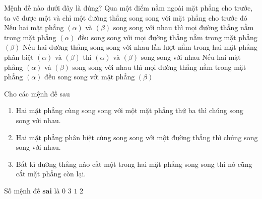 \begin{ex}%
	Mệnh đề nào dưới  đây là đúng?
	\choice 
		{Qua một điểm nằm ngoài mặt phẳng cho trước, ta vẽ được một và chỉ một đường thẳng song  song với mặt phẳng cho trước đó}
		{Nếu hai mặt phẳng $\left( \alpha \right)$  và $\left( \beta \right)$ song song với nhau thì mọi đường thẳng nằm trong mặt phẳng $\left( \alpha \right)$ đều song song với mọi đường thẳng nằm trong mặt phẳng $\left( \beta \right)$}
		{Nếu hai đường thẳng song song với nhau lần lượt nằm trong hai mặt phẳng phân biệt $\left( \alpha \right)$ và $\left( \beta \right)$ thì $\left( \alpha \right)$  và $\left( \beta \right)$ song song với nhau}
		{\True Nếu hai mặt phẳng $\left( \alpha \right)$ và $\left( \beta \right)$ song song với nhau thì mọi đường thẳng nằm trong mặt phẳng $\left(  \alpha \right)$ đều song song với mặt phẳng $\left( \beta \right)$}
\end{ex}

\begin{ex}%
	Cho các  mệnh đề sau
	\begin{enumerate}[1.]
		\item Hai mặt phẳng cùng song song với một mặt phẳng thứ ba thì chúng song  song với nhau.
		\item Hai mặt phẳng phân biệt cùng song song với một đường thẳng thì  chúng song song với nhau.
		\item Bất kì đường thẳng nào cắt một trong hai mặt phẳng song song thì nó cũng  cắt mặt phẳng còn lại.
	\end{enumerate}
	Số  mệnh đề $\textbf{sai}$ là
	\choice 
		{$0$} 
		{$3$} 
		 {$1$}
		{\True  $2$}
\end{ex}

